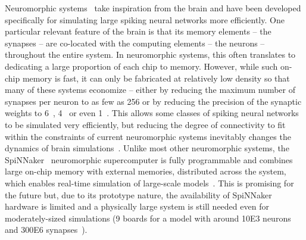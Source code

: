 \documentclass[9pt,twocolumn,twoside,lineno]{pnas-new}
\begin{document}
Neuromorphic systems~\citep{Frenkel2018,Frenkel2019,Furber2014,Merolla2014,Qiao2015,Schemmel2017} take inspiration from the brain and have been developed specifically for simulating large spiking neural networks more efficiently.
One particular relevant feature of the brain is that its memory elements -- the synapses -- are co-located with the computing elements -- the neurons -- throughout the entire system.
In neuromorphic systems, this often translates to dedicating a large proportion of each chip to memory.
However, while such on-chip memory is fast, it can only be fabricated at relatively low density so that many of these systems economize -- either by reducing the maximum number of synapses per neuron to as few as \num{256} or by reducing the precision of the synaptic weights to \num{6}~\citep{Schemmel2017}, \num{4}~\citep{Frenkel2018} or even \SI{1}{\bit}~\citep{Merolla2014,Frenkel2019}.
This allows some classes of spiking neural networks to be simulated very efficiently, but reducing the degree of connectivity to fit within the constraints of current neuromorphic systems inevitably changes the dynamics of brain simulations~\citep{VanAlbada2015}.
Unlike most other neuromorphic systems, the SpiNNaker~\citep{Furber2014} neuromorphic supercomputer is fully programmable and combines large on-chip memory with external memories, distributed across the system, which enables real-time simulation of large-scale models~\citep{Rhodes2019}.
This is promising for the future but, due to its prototype nature, the availability of SpiNNaker hardware is limited and a physically large system is still needed even for moderately-sized simulations (9 boards for a model with around \num{10E3} neurons and \num{300E6} synapses~\citep{Rhodes2019}).
\end{document}
